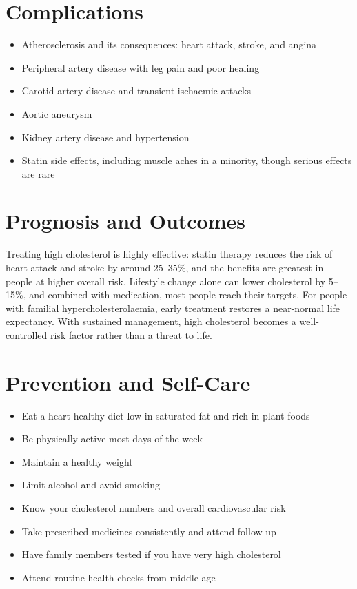 \section*{Complications}
\begin{itemize}
    \item Atherosclerosis and its consequences: heart attack, stroke, and angina
    \item Peripheral artery disease with leg pain and poor healing
    \item Carotid artery disease and transient ischaemic attacks
    \item Aortic aneurysm
    \item Kidney artery disease and hypertension
    \item Statin side effects, including muscle aches in a minority, though serious effects are rare
\end{itemize}

\section*{Prognosis and Outcomes}
Treating high cholesterol is highly effective: statin therapy reduces the risk of heart attack and stroke by around 25--35\%, and the benefits are greatest in people at higher overall risk. Lifestyle change alone can lower cholesterol by 5--15\%, and combined with medication, most people reach their targets. For people with familial hypercholesterolaemia, early treatment restores a near-normal life expectancy. With sustained management, high cholesterol becomes a well-controlled risk factor rather than a threat to life.

\section*{Prevention and Self-Care}
\begin{itemize}
    \item Eat a heart-healthy diet low in saturated fat and rich in plant foods
    \item Be physically active most days of the week
    \item Maintain a healthy weight
    \item Limit alcohol and avoid smoking
    \item Know your cholesterol numbers and overall cardiovascular risk
    \item Take prescribed medicines consistently and attend follow-up
    \item Have family members tested if you have very high cholesterol
    \item Attend routine health checks from middle age
\end{itemize}

